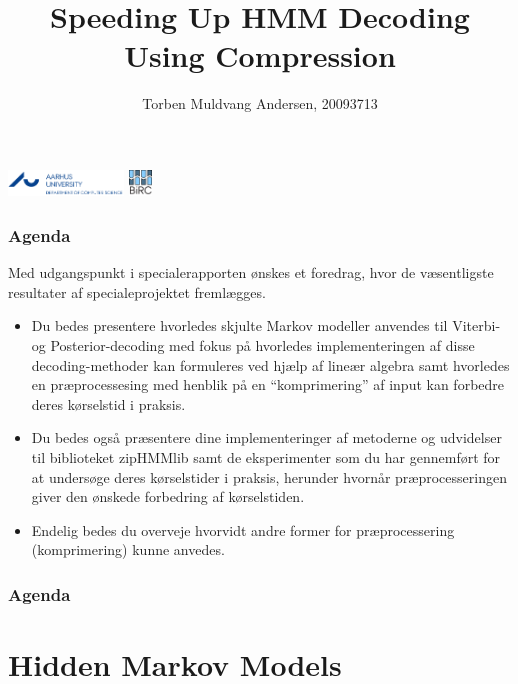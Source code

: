 \documentclass[english,notes]{beamer}
\title{Speeding Up HMM Decoding Using Compression}
\author{Torben Muldvang Andersen, 20093713}
\date{\protect\formatdate{24}{06}{2015}}
\begin{document}
\begin{frame}
  \maketitle
  \includegraphics[height=7mm, trim=0 0 40mm 0, clip]{../logo}
  \hfill
  \includegraphics[height=7mm]{../BiRC-logo}
\end{frame}

\begin{frame}
  \frametitle{Agenda}
    Med udgangspunkt i specialerapporten ønskes et foredrag, hvor de
    væsentligste resultater af specialeprojektet fremlægges.
  \begin{itemize}
  \item Du bedes presentere hvorledes skjulte Markov modeller anvendes til
    Viterbi- og Posterior-decoding med fokus på hvorledes implementeringen af
    disse decoding-methoder kan formuleres ved hjælp af lineær algebra samt
    hvorledes en præprocessesing med henblik på en ``komprimering'' af input
    kan forbedre deres kørselstid i praksis.
  \item Du bedes også præsentere dine implementeringer af metoderne og
    udvidelser til biblioteket zipHMMlib samt de eksperimenter som du har
    gennemført for at undersøge deres kørselstider i praksis, herunder hvornår
    præprocesseringen giver den ønskede forbedring af kørselstiden.
  \item Endelig bedes du overveje hvorvidt andre former for præprocessering
    (komprimering) kunne anvedes.
  \end{itemize}
\end{frame}

\begin{frame}
  \frametitle{Agenda}
  \tableofcontents{}
\end{frame}

\section{Hidden Markov Models}
\end{document}
